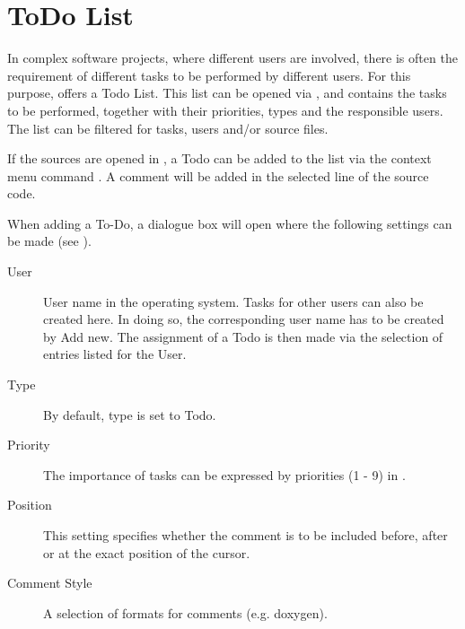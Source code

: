 \section{ToDo List}\label{sec:todo_list}

In complex software projects, where different users are involved, there is often the requirement of different tasks to be performed by different users. For this purpose, \codeblocks offers a Todo List. This list can be opened via , and contains the tasks to be performed, together with their priorities, types and the responsible users. The list can be filtered for tasks, users and/or source files.



If the sources are opened in \codeblocks, a Todo can be added to the list via the context menu command . A comment will be added in the selected line of the source code.


When adding a To-Do, a dialogue box will open where the following settings can be made (see ).


\begin{description}
\item[User] User name  in the operating system. Tasks for other users can also be created here. In doing so, the corresponding user name has to be created by Add new. The assignment of a Todo is then made via the selection of entries listed for the User.

\item[Type] By default, type is set to Todo.
\item[Priority] The importance of tasks can be expressed by priorities (1 - 9) in \codeblocks.
\item[Position] This setting specifies whether the comment is to be included before, after or at the exact position of the cursor.
\item[Comment Style] A selection of formats for comments (e.g. doxygen).
\end{description}
